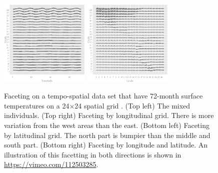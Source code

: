 \documentclass[12pt]{article}
\begin{document}
\begin{itemize}
\begin{center}
\begin{figure}[htp]
\begin{centering}
\includegraphics[width=0.38\textwidth]{graph/pipeline-24-2} \includegraphics[width=0.38\textwidth]{graph/pipeline-24-4}
\end{centering}

\caption{\label{fig:faceting-2ind}Faceting on a tempo-spatial data set
that have 72-month surface temperatures on a 24$\times$24 spatial grid 
\citep{murrell2010}.  (Top left) The mixed individuals.  (Top right) Faceting
by longitudinal grid. There is more variation from the west areas
than the east.  (Bottom left) Faceting by latitudinal grid.
The north part is bumpier than the middle and south part.
 (Bottom right) Faceting by longitude and latitude. An illustration of this facetting in both directions is shown in \url{https://vimeo.com/112503285}.}
\end{figure}
\end{center}



\end{itemize}
\end{document}
